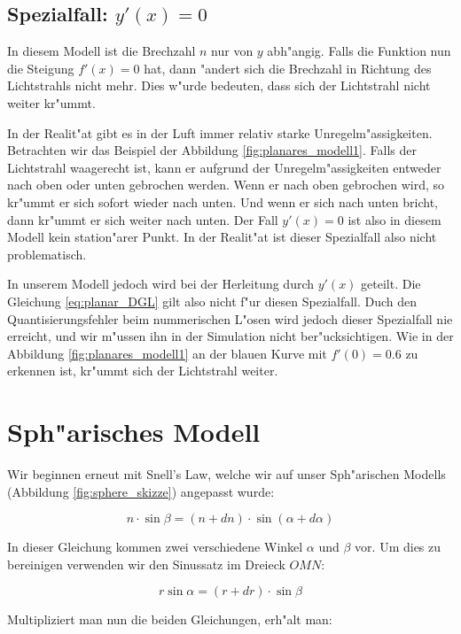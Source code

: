 \begin{refsection}
\begin{figure}
\end{figure}

\subsection{Spezialfall: $y'(x) = 0$} \label{ch:spezialfall}

In diesem Modell ist die Brechzahl $n$ nur von $y$ abh"angig. 
Falls die Funktion nun die Steigung $f'(x) = 0$ hat, dann "andert sich die Brechzahl in Richtung des Lichtstrahls nicht mehr.
Dies w"urde bedeuten, dass sich der Lichtstrahl nicht weiter kr"ummt. 

In der Realit"at gibt es in der Luft immer relativ starke Unregelm"assigkeiten. 
Betrachten wir das Beispiel der Abbildung \ref{fig:planares_modell1}. 
Falls der Lichtstrahl waagerecht ist, kann er aufgrund der Unregelm"assigkeiten entweder nach oben oder unten gebrochen werden. 
Wenn er nach oben gebrochen wird, so kr"ummt er sich sofort wieder nach unten.
Und wenn er sich nach unten bricht, dann kr"ummt er sich weiter nach unten.  
Der Fall $y'(x) = 0$ ist also in diesem Modell kein station"arer Punkt. 
In der Realit"at ist dieser Spezialfall also nicht problematisch. 

In unserem Modell jedoch wird bei der Herleitung durch $y'(x)$ geteilt.
Die Gleichung \ref{eq:planar_DGL} gilt also nicht f"ur diesen Spezialfall. 
Duch den Quantisierungsfehler beim nummerischen L"osen wird jedoch dieser Spezialfall nie erreicht, und wir m"ussen ihn in der Simulation nicht ber"ucksichtigen.
Wie in der Abbildung \ref{fig:planares_modell1} an der blauen Kurve mit $f'(0) = 0.6$ zu erkennen ist, kr"ummt sich der Lichtstrahl weiter.


\section{Sph"arisches Modell}

Wir beginnen erneut mit Snell's Law, welche wir auf unser Sph"arischen Modells (Abbildung \ref{fig:sphere_skizze}) angepasst wurde: 

$$n \cdot \sin \beta = (n + dn) \cdot \sin(\alpha + d\alpha)$$

In dieser Gleichung kommen zwei verschiedene Winkel $\alpha$ und $\beta$ vor. 
Um dies zu bereinigen verwenden wir den Sinussatz im Dreieck $OMN$:

$$r \sin\alpha = (r + dr) \cdot \sin\beta$$

Multipliziert man nun die beiden Gleichungen, erh"alt man:


\end{refsection}
